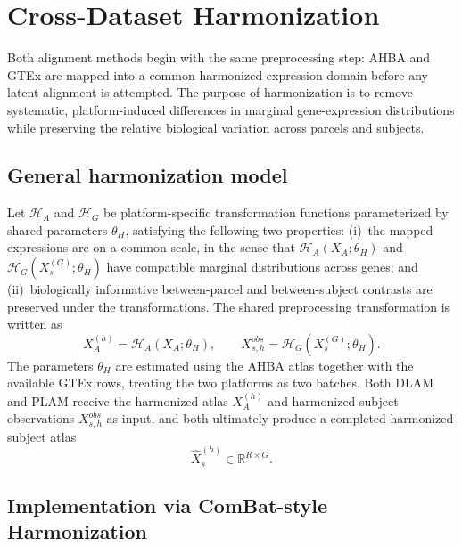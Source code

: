 \documentclass[11pt]{article}
\numberwithin{equation}{section}
\begin{document}
\section{Cross-Dataset Harmonization}
\label{sec:harmonization}

Both alignment methods begin with the same preprocessing step: AHBA and GTEx are
mapped into a common harmonized expression domain before any latent alignment is
attempted.  The purpose of harmonization is to remove systematic, platform-induced
differences in marginal gene-expression distributions while preserving the relative
biological variation across parcels and subjects.

\subsection{General harmonization model}
\label{sec:harmonization-general}

Let $\mathcal{H}_A$ and $\mathcal{H}_G$ be platform-specific transformation functions
parameterized by shared parameters $\theta_H$, satisfying the following two
properties: (i)~the mapped expressions are on a common scale, in the sense that
$\mathcal{H}_A(X_A;\theta_H)$ and $\mathcal{H}_G(X_s^{(G)};\theta_H)$ have compatible
marginal distributions across genes; and (ii)~biologically informative between-parcel
and between-subject contrasts are preserved under the transformations.  The shared
preprocessing transformation is written as
\begin{equation}
  \label{eq:shared-harmonization}
  X_A^{(h)} = \mathcal{H}_A(X_A;\theta_H),
  \qquad
  X_{s,h}^{obs} = \mathcal{H}_G(X_s^{(G)};\theta_H).
\end{equation}
The parameters $\theta_H$ are estimated using the AHBA atlas together with the
available GTEx rows, treating the two platforms as two batches.  Both DLAM and PLAM
receive the harmonized atlas
$X_A^{(h)}$ and harmonized subject observations $X_{s,h}^{obs}$ as input, and both
ultimately produce a completed harmonized subject atlas
\[
  \hat{X}_s^{(h)} \in \mathbb{R}^{R\times G}.
\]

\subsection{Implementation via ComBat-style Harmonization}
\label{sec:harmonization-combat}
\end{document}
